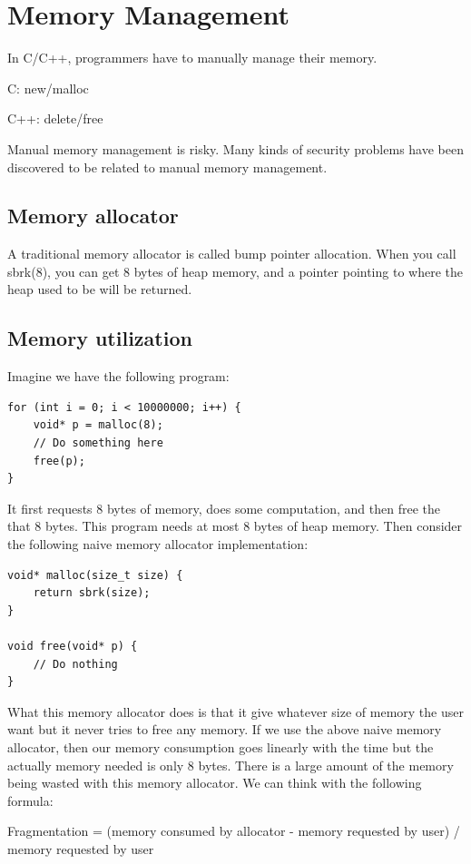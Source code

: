 \documentclass[twoside]{article}
\begin{document}
\section{Memory Management}
In C/C++, programmers have to manually manage their memory.

C: new/malloc

C++: delete/free

Manual memory management is risky. Many kinds of security problems have been discovered to be related to manual memory management.

\subsection{Memory allocator}

A traditional memory allocator is called bump pointer allocation. When you call sbrk(8), you can get 8 bytes of heap memory, and a pointer pointing to where the heap used to be will be returned.

\subsection{Memory utilization}

Imagine we have the following program:

\begin{lstlisting}
for (int i = 0; i < 10000000; i++) {
    void* p = malloc(8);
    // Do something here
    free(p);
}
\end{lstlisting}

It first requests 8 bytes of memory, does some computation, and then free the that 8 bytes. This program needs at most 8 bytes of heap memory. Then consider the following naive memory allocator implementation:

\begin{lstlisting}
void* malloc(size_t size) {
    return sbrk(size);
}

void free(void* p) {
    // Do nothing
}
\end{lstlisting}

What this memory allocator does is that it give whatever size of memory the user want but it never tries to free any memory. If we use the above naive memory allocator, then our memory consumption goes linearly with the time but the actually memory needed is only 8 bytes. There is a large amount of the memory being wasted with this memory allocator. We can think with the following formula:

Fragmentation = (memory consumed by allocator - memory requested by user) / memory requested by user
\end{document}
